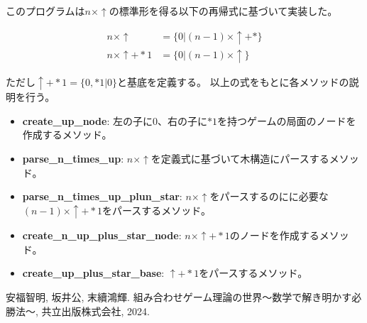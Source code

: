 \documentclass[uplatex,dvipdfmx,a4paper,10pt]{jsarticle}
\theoremstyle{definition}
\begin{document}
このプログラムは\(n \times \uparrow\)の標準形を得る以下の再帰式に基づいて実装した。

\begin{align}
    n \times \uparrow   &= \{0 | (n-1) \times \uparrow + *\} \\
    n \times \uparrow + *1   &= \{0 | (n-1) \times \uparrow \}
\end{align}

\noindent ただし\(\uparrow + *1 = \{0, *1 | 0\}\)と基底を定義する。
以上の式をもとに各メソッドの説明を行う。

\begin{itemize}
    \item \textbf{create\_up\_node}: 左の子に\(0\)、右の子に\(*1\)を持つゲームの局面のノードを作成するメソッド。
    \item \textbf{parse\_n\_times\_up}: \(n \times \uparrow\)を定義式に基づいて木構造にパースするメソッド。
    \item \textbf{parse\_n\_times\_up\_plun\_star}: \(n \times \uparrow\)をパースするのにに必要な\((n-1) \times \uparrow + *1\)をパースするメソッド。
    \item \textbf{create\_n\_up\_plus\_star\_node}: \(n \times \uparrow + *1\)のノードを作成するメソッド。
    \item \textbf{create\_up\_plus\_star\_base}: \(\uparrow + *1\)をパースするメソッド。
\end{itemize}

\begin{thebibliography}{99}
   安福智明, 坂井公, 末續鴻輝. 組み合わせゲーム理論の世界〜数学で解き明かす必勝法〜, 共立出版株式会社, 2024.
\end{thebibliography}
\appendix
\setcounter{figure}{0}
\setcounter{table}{0}
\renewcommand{\thetable}{\Alph{section}\arabic{table}}
\renewcommand{\thefigure}{\Alph{section}\arabic{figure}}
\makeatletter 
\newcommand{\section@cntformat}{付録 \thesection:\ }
\makeatother

    
\end{document}
